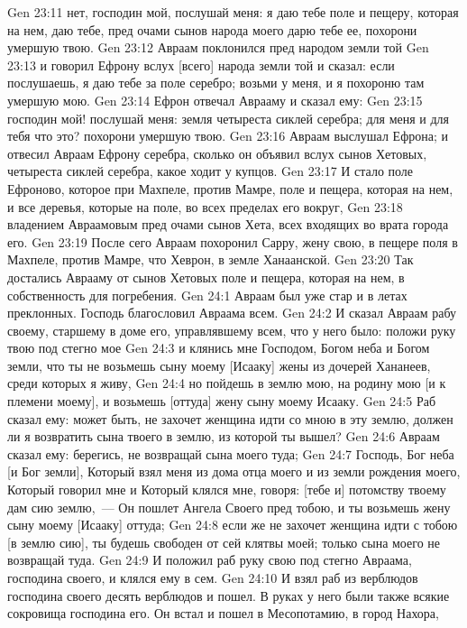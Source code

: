\vs Gen 23:11 нет, господин мой, послушай меня: я даю тебе поле и пещеру, которая на нем, даю тебе, пред очами сынов народа моего дарю тебе ее, похорони умершую твою.
\vs Gen 23:12 Авраам поклонился пред народом земли той
\vs Gen 23:13 и говорил Ефрону вслух [всего] народа земли той и сказал: если послушаешь, я даю тебе за поле серебро; возьми у меня, и я похороню там умершую мою.
\vs Gen 23:14 Ефрон отвечал Аврааму и сказал ему:
\vs Gen 23:15 господин мой! послушай меня: земля  четыреста сиклей серебра; для меня и для тебя что это? похорони умершую твою.
\vs Gen 23:16 Авраам выслушал Ефрона; и отвесил Авраам Ефрону серебра, сколько он объявил вслух сынов Хетовых, четыреста сиклей серебра, какое ходит у купцов.
\vs Gen 23:17 И стало поле Ефроново, которое при Махпеле, против Мамре, поле и пещера, которая на нем, и все деревья, которые на поле, во всех пределах его вокруг,
\vs Gen 23:18 владением Авраамовым пред очами сынов Хета, всех входящих во врата города его.
\rsbpar\vs Gen 23:19 После сего Авраам похоронил Сарру, жену свою, в пещере поля в Махпеле, против Мамре, что  Хеврон, в земле Ханаанской.
\vs Gen 23:20 Так достались Аврааму от сынов Хетовых поле и пещера, которая на нем, в собственность для погребения.
\vs Gen 24:1 Авраам был уже стар и в летах преклонных. Господь благословил Авраама всем.
\vs Gen 24:2 И сказал Авраам рабу своему, старшему в доме его, управлявшему всем, что у него было: положи руку твою под стегно мое
\vs Gen 24:3 и клянись мне Господом, Богом неба и Богом земли, что ты не возьмешь сыну моему [Исааку] жены из дочерей Хананеев, среди которых я живу,
\vs Gen 24:4 но пойдешь в землю мою, на родину мою [и к племени моему], и возьмешь [оттуда] жену сыну моему Исааку.
\vs Gen 24:5 Раб сказал ему: может быть, не захочет женщина идти со мною в эту землю, должен ли я возвратить сына твоего в землю, из которой ты вышел?
\vs Gen 24:6 Авраам сказал ему: берегись, не возвращай сына моего туда;
\vs Gen 24:7 Господь, Бог неба [и Бог земли], Который взял меня из дома отца моего и из земли рождения моего, Который говорил мне и Который клялся мне, говоря: [тебе и] потомству твоему дам сию землю,~--- Он пошлет Ангела Своего пред тобою, и ты возьмешь жену сыну моему [Исааку] оттуда;
\vs Gen 24:8 если же не захочет женщина идти с тобою [в землю сию], ты будешь свободен от сей клятвы моей; только сына моего не возвращай туда.
\vs Gen 24:9 И положил раб руку свою под стегно Авраама, господина своего, и клялся ему в сем.
\vs Gen 24:10 И взял раб из верблюдов господина своего десять верблюдов и пошел. В руках у него были также всякие сокровища господина его. Он встал и пошел в Месопотамию, в город Нахора,
